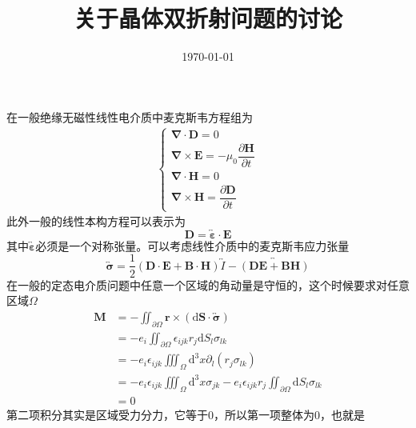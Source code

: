 \documentclass[12pt, a4paper, oneside]{ctexart}
\title{\Huge 关于晶体双折射问题的讨论}
\date{\today}
\begin{document}
	\maketitle
	在一般绝缘无磁性线性电介质中麦克斯韦方程组为
	\begin{equation}
		\begin{aligned}
			\begin{cases}
				\boldsymbol{\nabla} \cdot \boldsymbol{D} = 0 \\
				\boldsymbol{\nabla} \times \boldsymbol{E} = -\mu_{0}\dfrac{\partial \boldsymbol{H}}{\partial t} \\
				\boldsymbol{\nabla} \cdot \boldsymbol{H} = 0 \\
				\boldsymbol{\nabla} \times \boldsymbol{H} = \dfrac{\partial \boldsymbol{D}}{\partial t}
			\end{cases}
		\end{aligned}
	\end{equation}
	\quad\quad 此外一般的线性本构方程可以表示为
	\begin{equation}
		\boldsymbol{D}=\overleftrightarrow{\boldsymbol{\varepsilon}}\cdot\boldsymbol{E} 
	\end{equation}
	\quad\quad 其中$\overleftrightarrow{\boldsymbol{\varepsilon}}$必须是一个对称张量。可以考虑线性介质中的麦克斯韦应力张量
	\begin{equation}
		\overleftrightarrow{\boldsymbol{\sigma}}= \dfrac{1}{2}\left(\boldsymbol{D}\cdot\boldsymbol{E}+\boldsymbol{B}\cdot\boldsymbol{H}\right)\overleftrightarrow{I}-\overleftrightarrow{\left(\boldsymbol{D}\boldsymbol{E}+\boldsymbol{B}\boldsymbol{H}\right)}
	\end{equation}
	\quad\quad 在一般的定态电介质问题中任意一个区域的角动量是守恒的，这个时候要求对任意区域$\Omega$
	\begin{align}
		\boldsymbol{M}&=-\iint_{\partial\Omega}\boldsymbol{r}\times\left(\mathrm{d}\boldsymbol{S}\cdot\overleftrightarrow{\boldsymbol{\sigma}}\right)\\
		&=-e_{i}\iint_{\partial\Omega}\epsilon_{ijk}r_{j}\mathrm{d}S_{l}\sigma_{lk}\\
		&=-e_{i}\epsilon_{ijk}\iiint_{\Omega}\mathrm{d}^{3}x\partial_{l}\left(r_{j}\sigma_{lk}\right)\\
		&=-e_{i}\epsilon_{ijk}\iiint_{\Omega}\mathrm{d}^{3}x\sigma_{jk}-e_{i}\epsilon_{ijk}r_{j}\iint_{\partial\Omega}\mathrm{d}S_{l}\sigma_{lk}\\
		&=0
	\end{align}
	\quad\quad 第二项积分其实是区域受力分力，它等于$0$，所以第一项整体为$0$，也就是
\end{document}

